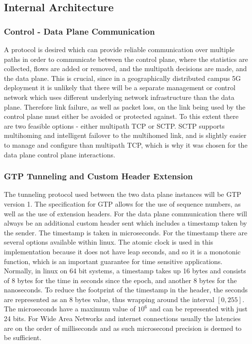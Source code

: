 \subsection{Internal Architecture}

\subsubsection{Control - Data Plane Communication}

A protocol is desired which can provide reliable communication over multiple paths in order to communicate between the control plane, where the statistics are collected, flows are added or removed, and the multipath decisions are made, and the data plane. This is crucial, since in a geographically distributed campus 5G deployment it is unlikely that there will be a separate management or control network which uses different underlying network infrastructure than the data plane. Therefore link failure, as well as packet loss, on the link being used by the control plane must either be avoided or protected against. To this extent there are two feasible options - either multipath TCP or SCTP. SCTP supports multihoming and intelligent failover to the multihomed link, and is slightly easier to manage and configure than multipath TCP, which is why it was chosen for the data plane control plane interactions.

\subsubsection{GTP Tunneling and Custom Header Extension}

The tunneling protocol used between the two data plane instances will  be GTP \cite{GTP-spec} version 1. The specification for GTP allows for the use of sequence numbers, as well as the use of extension headers. For the data plane communication there will always be an additional custom header sent which includes a timestamp taken by the sender. The timestamp is taken in microseconds. For the timestamp there are several options available within linux. The atomic clock is used in this implementation because it does not have leap seconds, and so it is a monotonic function, which is an important guarantee for time sensitive applications. Normally, in linux on 64 bit systems, a timestamp takes up 16 bytes and consists of 8 bytes for the time in seconds since the epoch, and another 8 bytes for the nanoseconds. To reduce the footprint of the timestamp in the header, the seconds are represented as an 8 bytes value, thus wrapping around the interval $[0,255]$. The microseconds have a maximum value of $10^6$ and can be represented with just 24 bits. For Wide Area Networks and internet connections usually the latencies are on the order of milliseconds and as such microsecond precision is deemed to be sufficient.

